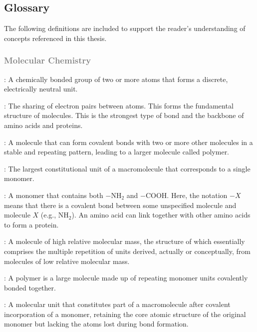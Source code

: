 \documentclass[a4paper,12pt]{extarticle}
\begin{document}
  \cleardoublepage


  \tableofcontents
  \cleardoublepage


  \subsection*{%
    \centering Glossary
  }
  
  The following definitions are included to support the reader's understanding of concepts referenced in this thesis.
  
  \subsubsection*{%
    \textcolor{gray}{Molecular Chemistry}
  }

  \begin{description}[leftmargin=1.2em]
    \item[Molecule]: A chemically bonded group of two or more atoms that forms a discrete, electrically neutral unit.
    \item[Covalent Bond]: The sharing of electron pairs between atoms. This forms the fundamental structure of molecules. This is the strongest type of bond and the backbone of amino acids and proteins.
    \item[Monomer]: A molecule that can form covalent bonds with two or more other molecules in a stable and repeating pattern, leading to a larger molecule called polymer.
    \item[Monomeric Unit]: The largest constitutional unit of a macromolecule that corresponds to a single monomer.
    \item[Amino Acid]: A monomer that contains both \(-\text{NH}_2\) and \(-\text{COOH}\). Here, the notation \(-X\) means that there is a covalent bond between some unspecified molecule and molecule \(X\) (e.g., \(\text{NH}_2\)). An amino acid can link together with other amino acids to form a protein.
    \item[Macromolecule]: A molecule of high relative molecular mass, the structure of which essentially comprises the multiple repetition of units derived, actually or conceptually, from molecules of low relative molecular mass.
    \item[Polymer]: A polymer is a large molecule made up of repeating monomer units covalently bonded together.
    \item[Residue]: A molecular unit that constitutes part of a macromolecule after covalent incorporation of a monomer, retaining the core atomic structure of the original monomer but lacking the atoms lost during bond formation.
  \end{description}
  
\end{document}
